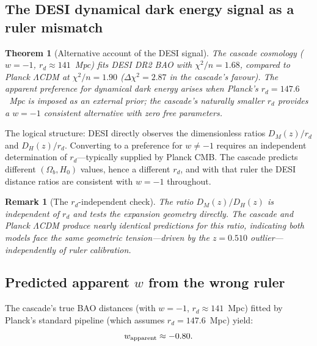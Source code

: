 \documentclass[12pt,a4paper]{article}
\newtheorem{theorem}{Theorem}[section]
\newtheorem*{remark}{Remark}
\begin{document}
\subsection{The DESI dynamical dark energy signal as a ruler mismatch}

\begin{theorem}[Alternative account of the DESI signal]
The cascade cosmology ($w = -1$, $r_d \approx 141$~Mpc) fits DESI DR2 BAO with
$\chi^2/n = 1.68$, compared to Planck $\Lambda$CDM at $\chi^2/n = 1.90$
($\Delta\chi^2 = 2.87$ in the cascade's favour). The apparent preference for dynamical
dark energy arises when Planck's $r_d = 147.6$~Mpc is imposed as an external prior;
the cascade's naturally smaller $r_d$ provides a $w = -1$ consistent alternative with
zero free parameters.
\end{theorem}

The logical structure: DESI directly observes the dimensionless ratios $D_M(z)/r_d$ and
$D_H(z)/r_d$. Converting to a preference for $w \neq -1$ requires an independent
determination of $r_d$---typically supplied by Planck CMB. The cascade predicts different
$(\Omega_b, H_0)$ values, hence a different $r_d$, and with that ruler the DESI distance ratios
are consistent with $w = -1$ throughout.

\begin{remark}[The $r_d$-independent check]
The ratio $D_M(z)/D_H(z)$ is independent of $r_d$ and tests the expansion geometry
directly. The cascade and Planck $\Lambda$CDM produce nearly identical predictions for this
ratio, indicating both models face the same geometric tension---driven by the $z = 0.510$
outlier---independently of ruler calibration.
\end{remark}

\subsection{Predicted apparent $w$ from the wrong ruler}

The cascade's true BAO distances (with $w = -1$, $r_d \approx 141$~Mpc) fitted by Planck's
standard pipeline (which assumes $r_d = 147.6$~Mpc) yield:
\begin{equation}
w_{\rm apparent} \approx -0.80.\label{eq:wapp}
\end{equation}
\end{document}
